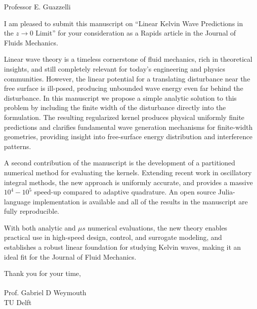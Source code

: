 \documentclass[12pt]{article}
\begin{document}
\noindent
Professor E. Guazzelli

\vspace{1cm}

I am pleased to submit this manuscript on ``Linear Kelvin Wave Predictions in the $z\to 0$ Limit'' for your consideration as a Rapids article in the Journal of Fluids Mechanics. 

Linear wave theory is a timeless cornerstone of fluid mechanics, rich in theoretical insights, and still completely relevant for today's engineering and physics communities. However, the linear potential for a translating disturbance near the free surface is ill-posed, producing unbounded wave energy even far behind the disturbance. In this manuscript we propose a simple analytic solution to this problem by including the finite width of the disturbance directly into the formulation. The resulting regularized kernel produces physical uniformly finite predictions and clarifies fundamental wave generation mechanisms for finite-width geometries, providing insight into free-surface energy distribution and interference patterns. 

A second contribution of the manuscript is the development of a partitioned numerical method for evaluating the kernels. Extending recent work in oscillatory integral methods, the new approach is uniformly accurate, and provides a massive $10^4-10^5$ speed-up compared to adaptive quadrature. An open source Julia-language implementation is available and all of the results in the manuscript are fully reproducible. 

With both analytic and $\mu s$ numerical evaluations, the new theory enables practical use in high-speed design, control, and surrogate modeling, and establishes a robust linear foundation for studying Kelvin waves, making it an ideal fit for the Journal of Fluid Mechanics.

\vspace{1cm}

\noindent
Thank you for your time,\\ \\
Prof. Gabriel D Weymouth\\
TU Delft
\end{document}
